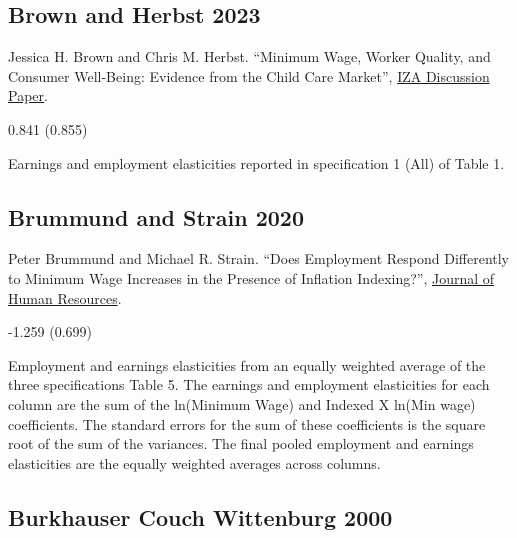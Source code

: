 \subsection*{Brown and Herbst 2023}
\vspace{-0.7em}

\noindent Jessica H. Brown and Chris M. Herbst. ``Minimum Wage, Worker Quality, and Consumer Well-Being: Evidence from the Child Care Market'', \href{https://docs.iza.org/dp16257.pdf}{IZA Discussion Paper}.

\vspace{0.7em}

 0.841 (0.855)

\vspace{0.7em}

 Earnings and employment elasticities reported in specification 1 (All) of Table 1.

\subsection*{Brummund and Strain 2020}
\vspace{-0.7em}

\noindent Peter Brummund and Michael R. Strain. ``Does Employment Respond Differently to Minimum Wage Increases in the Presence of Inflation Indexing?'', \href{https://doi.org/10.3368/jhr.55.2.1216.8404R2}{Journal of Human Resources}.

\vspace{0.7em}

 -1.259 (0.699)

\vspace{0.7em}

 Employment and earnings elasticities from an equally weighted average of the three specifications Table 5. The earnings and employment elasticities for each column are the sum of the ln(Minimum Wage) and Indexed X ln(Min wage) coefficients. The standard errors for the sum of these coefficients is the square root of the sum of the variances. The final pooled employment and earnings elasticities are the equally weighted averages across columns.

\subsection*{Burkhauser Couch Wittenburg 2000}
\vspace{-0.7em}

